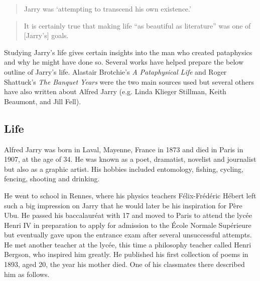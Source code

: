 \begin{quotation}
  Jarry was `attempting to transcend his own existence.' 
\end{quotation}

\begin{quotation}
  It is certainly true that making life ``as beautiful as literature'' was one of [Jarry's] goals. 
\end{quotation}

Studying Jarry's life gives certain insights into the man who created pataphysics and why he might have done so. Several works have helped prepare the below outline of Jarry's life. Alastair Brotchie's \textit{A Pataphysical Life} \citeyear{Brotchie2011a} and Roger Shattuck's \textit{The Banquet Years} \citeyear{Shattuck1959} were the two main sources used but several others have also written about Alfred Jarry (e.g. Linda Klieger Stillman, Keith Beaumont, and Jill Fell).


\subsection{Life}

Alfred Jarry was born in Laval, Mayenne, France in 1873 and died in Paris in 1907, at the age of 34. He was known as a poet, dramatist, novelist and journalist but also as a graphic artist. His hobbies included entomology, fishing, cycling, fencing, shooting and drinking.


He went to school in Rennes, where his physics teachers Félix-Frédéric Hébert left such a big impression on Jarry that he would later be his inspiration for Père Ubu. He passed his baccalauréat with 17 and moved to Paris to attend the lycée Henri IV in preparation to apply for admission to the École Normale Supérieure but eventually gave upon the entrance exam after several unsuccessful attempts. He met another teacher at the lycée, this time a philosophy teacher called Henri Bergson, who inspired him greatly. He published his first collection of poems in 1893, aged 20, the year his mother died. One of his classmates there described him as follows.


